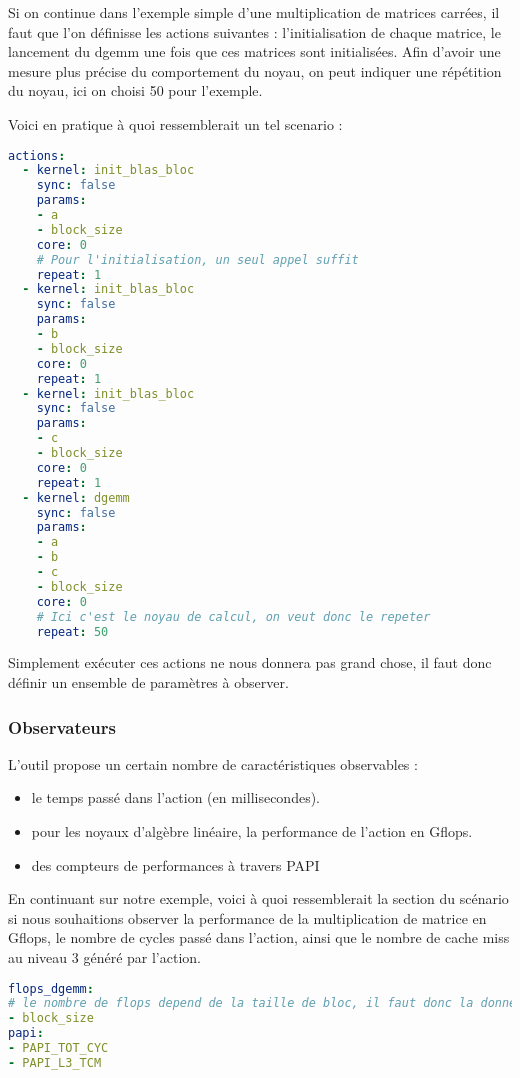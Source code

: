 Si on continue dans l'exemple simple d'une multiplication de matrices carrées, il faut que l'on définisse les actions suivantes : l'initialisation de chaque matrice, le lancement du dgemm une fois que ces matrices sont initialisées.
Afin d'avoir une mesure plus précise du comportement du noyau, on peut indiquer une répétition du noyau, ici on choisi 50 pour l'exemple.

Voici en pratique à quoi ressemblerait un tel scenario :
\begin{lstlisting}[language=yaml]
  actions: 
  - kernel: init_blas_bloc
    sync: false
    params: 
    - a
    - block_size
    core: 0
    # Pour l'initialisation, un seul appel suffit
    repeat: 1
  - kernel: init_blas_bloc
    sync: false
    params: 
    - b
    - block_size
    core: 0
    repeat: 1
  - kernel: init_blas_bloc
    sync: false
    params: 
    - c
    - block_size
    core: 0
    repeat: 1
  - kernel: dgemm
    sync: false
    params: 
    - a
    - b
    - c
    - block_size
    core: 0
    # Ici c'est le noyau de calcul, on veut donc le repeter
    repeat: 50
\end{lstlisting}

Simplement exécuter ces actions ne nous donnera pas grand chose, il faut donc définir un ensemble de paramètres à observer.

\subsubsection{Observateurs}

L'outil propose un certain nombre de caractéristiques observables :

\begin{itemize}
  \item le temps passé dans l'action (en millisecondes).
  \item pour les noyaux d'algèbre linéaire, la performance de l'action en Gflops.
  \item des compteurs de performances à travers PAPI
\end{itemize}

En continuant sur notre exemple, voici à quoi ressemblerait la section du scénario si nous souhaitions observer la performance de la multiplication de matrice en Gflops, le nombre de cycles passé dans l'action, ainsi que le nombre de cache miss au niveau 3 généré par l'action.

\begin{lstlisting}[language=yaml]
flops_dgemm:
# le nombre de flops depend de la taille de bloc, il faut donc la donner en parametre
- block_size
papi:
- PAPI_TOT_CYC
- PAPI_L3_TCM
\end{lstlisting}

